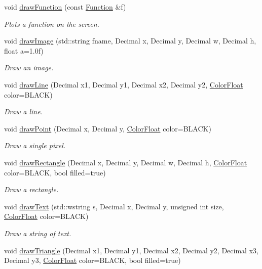 \begin{DoxyCompactItemize}
void \hyperlink{class_cartesian_canvas_abfa7f10eb248cf6f4bf7400715ec13ac}{draw\+Function} (const \hyperlink{class_function}{Function} \&f)
\begin{DoxyCompactList}\small\item\em Plots a function on the screen. \end{DoxyCompactList}\item 
void \hyperlink{class_cartesian_canvas_a005e388fa00cc3cc7549f657cd58db84}{draw\+Image} (std\+::string fname, Decimal x, Decimal y, Decimal w, Decimal h, float a=1.\+0f)
\begin{DoxyCompactList}\small\item\em Draw an image. \end{DoxyCompactList}\item 
void \hyperlink{class_cartesian_canvas_a364a55de8ac9d0734a44a4b4af9d5af5}{draw\+Line} (Decimal x1, Decimal y1, Decimal x2, Decimal y2, \hyperlink{struct_color_float}{Color\+Float} color=B\+L\+A\+C\+K)
\begin{DoxyCompactList}\small\item\em Draw a line. \end{DoxyCompactList}\item 
void \hyperlink{class_cartesian_canvas_aa8d3c41d0b54358245b0164230225f05}{draw\+Point} (Decimal x, Decimal y, \hyperlink{struct_color_float}{Color\+Float} color=B\+L\+A\+C\+K)
\begin{DoxyCompactList}\small\item\em Draw a single pixel. \end{DoxyCompactList}\item 
void \hyperlink{class_cartesian_canvas_a54ad4dd438a1cbb1353fb3cb5c5da5c4}{draw\+Rectangle} (Decimal x, Decimal y, Decimal w, Decimal h, \hyperlink{struct_color_float}{Color\+Float} color=B\+L\+A\+C\+K, bool filled=true)
\begin{DoxyCompactList}\small\item\em Draw a rectangle. \end{DoxyCompactList}\item 
void \hyperlink{class_cartesian_canvas_a27f832df7e100315a8ceb385e133326f}{draw\+Text} (std\+::wstring s, Decimal x, Decimal y, unsigned int size, \hyperlink{struct_color_float}{Color\+Float} color=B\+L\+A\+C\+K)
\begin{DoxyCompactList}\small\item\em Draw a string of text. \end{DoxyCompactList}\item 
void \hyperlink{class_cartesian_canvas_a72ddd5a50452068da422fa36847de378}{draw\+Triangle} (Decimal x1, Decimal y1, Decimal x2, Decimal y2, Decimal x3, Decimal y3, \hyperlink{struct_color_float}{Color\+Float} color=B\+L\+A\+C\+K, bool filled=true)

\end{DoxyCompactItemize}
